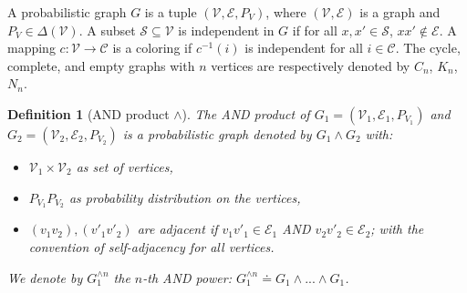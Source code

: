 \documentclass[conference,a4paper]{IEEEtran}
\newtheorem{definition}[theorem]{Definition}
\def\ar#1{\textcolor{red}{\footnotesize {(ar: #1)}}}
\begin{document}
A probabilistic graph $G$ is a tuple $(\mathcal{V}, \mathcal{E}, P_V)$, where $(\mathcal{V}, \mathcal{E})$ is a graph and $P_V \in \Delta(\mathcal{V})$.
A subset $\mathcal{S} \subseteq \mathcal{V}$ is independent in $G$ if for all $x,x' \in \mathcal{S}$, $xx' \notin \mathcal{E}$. A mapping $c : \mathcal{V} \rightarrow \mathcal{C}$ is a coloring if $c^{-1}(i)$ is independent for all $i \in \mathcal{C}$. The cycle, complete, and empty graphs with $n$ vertices are respectively denoted by $C_n$, $K_n$, $N_n$. %

\begin{definition}[AND product $\wedge$]
The AND product of $G_1 = (\mathcal{V}_1, \mathcal{E}_1, P_{V_1})$ and $G_2 = (\mathcal{V}_2, \mathcal{E}_2, P_{V_2})$ is a probabilistic graph denoted by $G_1 \wedge G_2$ with: 
\begin{itemize}[label = -]
    \item $\mathcal{V}_1 \times \mathcal{V}_2$ as set of vertices,
    \item $P_{V_1}P_{V_2}$ as probability distribution on the vertices,
    \item $(v_1 v_2),(v'_1 v'_2)$ are adjacent if $v_1v'_1 \in \mathcal{E}_1$ AND $v_2v'_2 \in \mathcal{E}_2$; with the convention of self-adjacency for all vertices.
\end{itemize}
We denote by $G_1^{\wedge n}$ the $n$-th AND power: $G_1^{\wedge n} \doteq G_1 \wedge ... \wedge G_1$.\vspace{-.7em}
\end{definition} %
\end{document}
